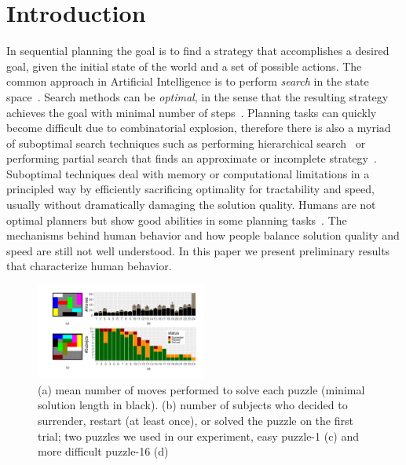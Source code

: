 \documentclass[10pt,letterpaper]{article}
\begin{document}
\vspace{-0.7cm}
\section{Introduction}
\vspace{-0.3cm}
In sequential planning the goal is to find a strategy that accomplishes a desired goal, given the initial state of the world and a set of possible actions. The common approach in Artificial Intelligence is to perform \emph{search} in the state space~\cite{russell1995modern}. Search methods can be \emph{optimal}, in the sense that the resulting strategy achieves the goal with minimal number of steps~\cite{korf1985depth,hart1968formal}. Planning tasks can quickly become difficult due to combinatorial explosion, therefore there is also a myriad of suboptimal search techniques such as performing hierarchical search~\cite{holte2005hierarchical} or performing partial search that finds an approximate or incomplete strategy~\cite{korf1990real,koenig2001agent}. Suboptimal techniques deal with memory or computational limitations in a principled way by efficiently sacrificing optimality for tractability and speed, usually without dramatically damaging the solution quality. Humans are not optimal planners but show good abilities in some planning tasks~\cite{acuna2008bayesian,pizlo2005solving,macgregor1996human,van2016people}. The mechanisms behind human behavior and how people balance solution quality and speed are still not well understood. In this paper we present preliminary results that characterize human behavior. 




\begin{figure}[ht]
	\includegraphics[width=0.5\textwidth]{puzzle_j}
\vspace{-0.5cm}
\caption{ (a) mean number of moves performed to solve each puzzle (minimal solution length in black). (b) number of subjects who decided to surrender, restart (at least once), or solved the puzzle on the first trial; two puzzles we used in our experiment, easy puzzle-1 (c) and more difficult puzzle-16 (d)}
	\label{fig:puzzle}
\vspace{-0.5cm}
\end{figure}
\end{document}
